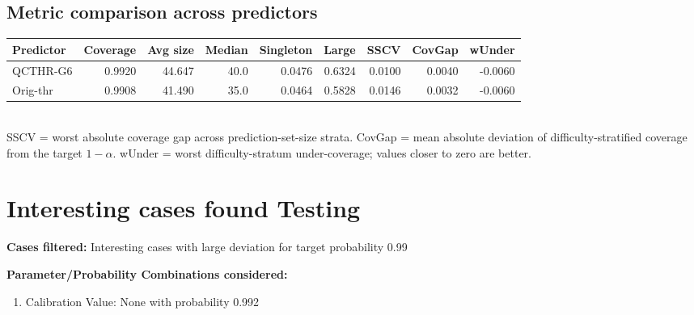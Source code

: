 \documentclass[parskip=half]{scrartcl}
\begin{document}
\subsection{Metric comparison across predictors}
\begin{tabular}{l r r r r r r r r}
\hline
Predictor & Coverage & Avg size & Median & Singleton & Large & SSCV & CovGap & wUnder \\
\hline
QCTHR-G6 & 0.9920 & 44.647 & 40.0 & 0.0476 & 0.6324 & 0.0100 & 0.0040 & -0.0060 \\
Orig-thr & 0.9908 & 41.490 & 35.0 & 0.0464 & 0.5828 & 0.0146 & 0.0032 & -0.0060 \\
\hline
\end{tabular}\\[0.5em]
\textsf{\scriptsize SSCV = worst absolute coverage gap across prediction-set-size strata. CovGap = mean absolute deviation of difficulty-stratified coverage from the target $1-\alpha$. wUnder = worst difficulty-stratum under-coverage; values closer to zero are better.}\\
\section{Interesting cases found Testing}
\textbf{Cases filtered:} Interesting cases with large deviation for target probability 0.99


\textbf{Parameter/Probability Combinations considered:}\begin{enumerate}
\item Calibration Value: None with probability 0.992
\end{enumerate}
        
\end{document}
